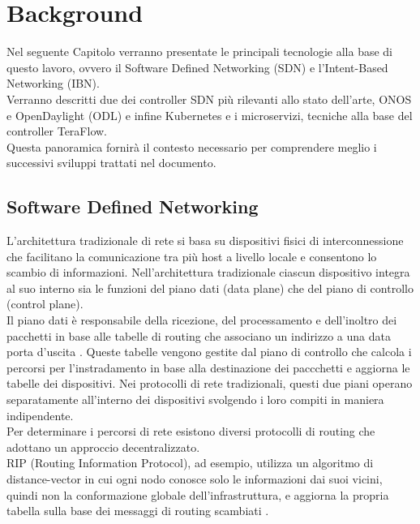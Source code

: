 \chapter{Background}
\label{cap:contesto}
Nel seguente Capitolo verranno presentate le principali tecnologie alla base di questo lavoro, ovvero il Software Defined Networking (SDN) e l'Intent-Based Networking (IBN). 
\\Verranno descritti due dei controller SDN più rilevanti allo stato dell'arte, ONOS \cite{ONOS} e OpenDaylight (ODL) \cite{ODL} e infine Kubernetes e i microservizi, tecniche alla base del controller TeraFlow.
\\Questa panoramica fornirà il contesto necessario per comprendere meglio i successivi sviluppi trattati nel documento.
\section{Software Defined Networking}
L'architettura tradizionale di rete si basa su dispositivi fisici di interconnessione che facilitano la comunicazione tra più host a livello locale e consentono lo scambio di informazioni.
Nell'architettura tradizionale ciascun dispositivo integra al suo interno sia le funzioni del piano dati (data plane) che del piano di controllo (control plane). 
\\Il piano dati è responsabile della ricezione, del processamento e dell'inoltro dei pacchetti in base alle tabelle di routing che associano un indirizzo a una data porta d'uscita \cite{tesiSDN:2020}. 
Queste tabelle vengono gestite dal piano di controllo che calcola i percorsi 
per l'instradamento in base alla destinazione dei paccchetti e aggiorna le tabelle dei dispositivi. 
Nei protocolli di rete tradizionali, questi due piani operano separatamente all'interno dei dispositivi svolgendo i loro compiti in maniera indipendente. 
\\Per determinare i percorsi di rete esistono diversi protocolli di routing che adottano un approccio decentralizzato.
\\RIP (Routing Information Protocol), ad esempio, utilizza un algoritmo di distance-vector in cui ogni nodo conosce solo le informazioni dai suoi vicini, quindi non la conformazione globale dell'infrastruttura, e aggiorna la propria tabella sulla base dei messaggi di routing scambiati \cite{rip}.
